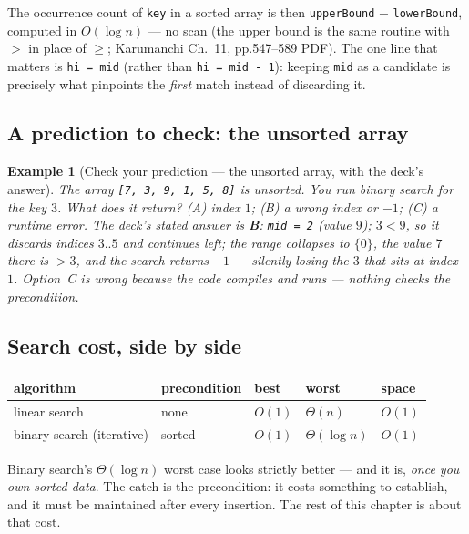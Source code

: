 \documentclass[11pt]{article}
\newtheorem{example}{Example}[section]
\begin{document}
The occurrence count of \texttt{key} in a sorted array is then \texttt{upperBound} $-$ \texttt{lowerBound}, computed in $O(\log n)$ --- no scan (the upper bound is the same routine with $>$ in place of $\ge$; Karumanchi Ch.~11, pp.547--589 PDF). The one line that matters is \texttt{hi = mid} (rather than \texttt{hi = mid - 1}): keeping \texttt{mid} as a candidate is precisely what pinpoints the \emph{first} match instead of discarding it.

\subsection{A prediction to check: the unsorted array}
\label{ss:unsorted-prediction}

\begin{example}[Check your prediction --- the unsorted array, with the deck's answer]
The array \texttt{[7, 3, 9, 1, 5, 8]} is unsorted. You run binary search for the key $3$. What does it return? (A) index $1$; (B) a wrong index or $-1$; (C) a runtime error. The deck's stated answer is \textbf{B}: \texttt{mid = 2} (value $9$); $3 < 9$, so it discards indices $3..5$ and continues left; the range collapses to $\{0\}$, the value $7$ there is $> 3$, and the search returns $-1$ --- silently losing the $3$ that sits at index $1$. Option~C is wrong because the code compiles and runs --- nothing checks the precondition.
\end{example}

\subsection{Search cost, side by side}

\begin{center}
{\footnotesize
\begin{tabular}{lllll}
  \toprule
  \textbf{algorithm} & \textbf{precondition} & \textbf{best} &
    \textbf{worst} & \textbf{space} \\
  \midrule
  linear search & none & $O(1)$ & $\Theta(n)$ & $O(1)$ \\
  binary search (iterative) & sorted & $O(1)$ & $\Theta(\log n)$ & $O(1)$ \\
  \bottomrule
\end{tabular}}
\end{center}

Binary search's $\Theta(\log n)$ worst case looks strictly better --- and it is, \emph{once you own sorted data}. The catch is the precondition: it costs something to establish, and it must be maintained after every insertion. The rest of this chapter is about that cost.
\end{document}
